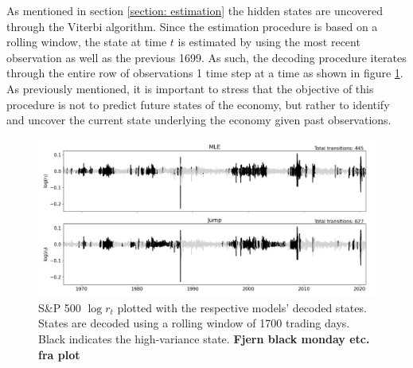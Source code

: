 As mentioned in section \ref{section: estimation} the hidden states are uncovered through the Viterbi algorithm. Since the estimation procedure is based on a rolling window, the state at time $t$ is estimated by using the most recent observation as well as the previous 1699. As such, the decoding procedure iterates through the entire row of observations 1 time step at a time as shown in figure \ref{fig:stylized_facts_decoded_states}. As previously mentioned, it is important to stress that the objective of this procedure is not to predict future states of the economy, but rather to identify and uncover the current state underlying the economy given past observations. 

\begin{figure}[H] 
    \centering
    \includegraphics[width=1.0\textwidth]{analysis/stylized_facts/images/decoded_states.png}
    \caption[S\&P 500 $\log r_t$ plotted with the respective models' decoded states]{S\&P 500 $\log r_t$ plotted with the respective models' decoded states. States are decoded using a rolling window of 1700 trading days. Black indicates the high-variance state. \textbf{Fjern black monday etc. fra plot}}
    \label{fig:stylized_facts_decoded_states} 
\end{figure}

